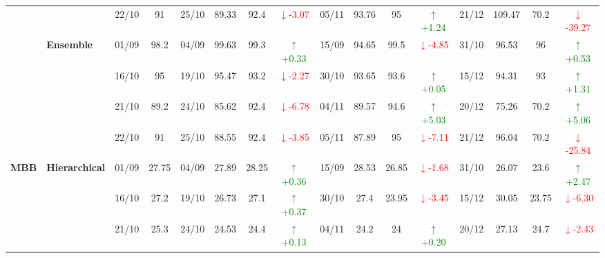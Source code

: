 \documentclass{ieeeaccess}
\begin{document}
{\begin{longtable}{llcc|cccc|cccc|cccc}
&
& 22/10 & 91 & 25/10 & 89.33 & 92.4 & \textcolor{red}{\(\downarrow\)-3.07} & 05/11 & 93.76 & 95 & \textcolor{green}{\(\uparrow\)+1.24} & 21/12 & 109.47 & 70.2 & \textcolor{red}{\(\downarrow\)-39.27} \\
\cmidrule(lr){2-16}


& \textbf{Ensemble}
& 01/09 & 98.2 & 04/09 & 99.63 & 99.3 & \textcolor{green}{\(\uparrow\)+0.33} & 15/09 & 94.65 & 99.5 & \textcolor{red}{\(\downarrow\)-4.85} & 31/10 & 96.53 & 96 & \textcolor{green}{\(\uparrow\)+0.53} \\

&
& 16/10 & 95 & 19/10 & 95.47 & 93.2 & \textcolor{red}{\(\downarrow\)-2.27} & 30/10 & 93.65 & 93.6 & \textcolor{green}{\(\uparrow\)+0.05} & 15/12 & 94.31 & 93 & \textcolor{green}{\(\uparrow\)+1.31} \\

&
& 21/10 & 89.2 & 24/10 & 85.62 & 92.4 & \textcolor{red}{\(\downarrow\)-6.78} & 04/11 & 89.57 & 94.6 & \textcolor{green}{\(\uparrow\)+5.03} & 20/12 & 75.26 & 70.2 & \textcolor{green}{\(\uparrow\)+5.06} \\

&
& 22/10 & 91 & 25/10 & 88.55 & 92.4 & \textcolor{red}{\(\downarrow\)-3.85} & 05/11 & 87.89 & 95 & \textcolor{red}{\(\downarrow\)-7.11} & 21/12 & 96.04 & 70.2 & \textcolor{red}{\(\downarrow\)-25.84} \\
\midrule



\multirow{12}{*}{\textbf{MBB}} 
& \textbf{Hierarchical}
& 01/09 & 27.75 & 04/09 & 27.89 & 28.25 & \textcolor{green}{\(\uparrow\)+0.36} & 15/09 & 28.53 & 26.85 & \textcolor{red}{\(\downarrow\)-1.68} & 31/10 & 26.07 & 23.6 & \textcolor{green}{\(\uparrow\)+2.47} \\

&
& 16/10 & 27.2 & 19/10 & 26.73 & 27.1 & \textcolor{green}{\(\uparrow\)+0.37} & 30/10 & 27.4 & 23.95 & \textcolor{red}{\(\downarrow\)-3.45} & 15/12 & 30.05 & 23.75 & \textcolor{red}{\(\downarrow\)-6.30} \\

&
& 21/10 & 25.3 & 24/10 & 24.53 & 24.4 & \textcolor{green}{\(\uparrow\)+0.13} & 04/11 & 24.2 & 24 & \textcolor{green}{\(\uparrow\)+0.20} & 20/12 & 27.13 & 24.7 & \textcolor{red}{\(\downarrow\)-2.43} \\


\end{longtable}}
\end{document}
